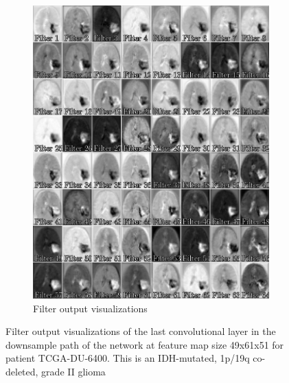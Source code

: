 \begin{subappendices}
\begin{figure}
\begin{subfigure}[b]{0.77\textwidth}
        \includegraphics[width=\textwidth]{Figures/conv_filter_LGG_shallow.pdf}
        \caption{Filter output visualizations}\label{fig:prognosais_filter_lgg_shallow_filter_only}
    \end{subfigure}
    \caption{Filter output visualizations of the last convolutional layer in the downsample path of the network at feature map size 49x61x51 for patient TCGA-DU-6400.
    This is an \acrshort{IDH}-mutated,  1p/19q co-deleted, grade II glioma}\label{fig:filter_lgg_shallow}
\end{figure}


\end{subappendices}
